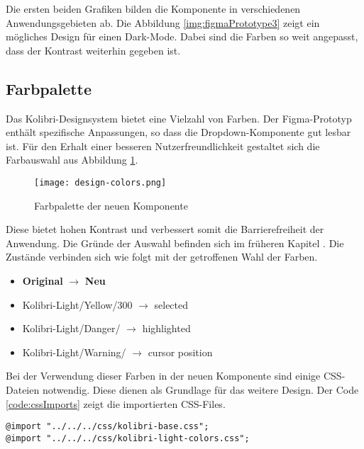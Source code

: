 Die ersten beiden Grafiken bilden die Komponente in verschiedenen Anwendungsgebieten ab. 
Die Abbildung \ref{img:figmaPrototype3} zeigt ein mögliches Design für einen Dark-Mode. 
Dabei sind die Farben so weit angepasst, dass der Kontrast weiterhin gegeben ist. 


\subsection{Farbpalette}
\label{sec:colorContrast}

Das Kolibri-Designsystem bietet eine Vielzahl von Farben. 
Der Figma-Prototyp enthält spezifische Anpassungen, so dass die Dropdown-Komponente gut lesbar ist. 
Für den Erhalt einer besseren Nutzerfreundlichkeit gestaltet sich die Farbauswahl aus Abbildung \ref{img:designColors}. 

\begin{figure}[!htb]
    \centering
    \texttt{[image: design-colors.png]}
    \caption{\centering Farbpalette der neuen Komponente}
    \label{img:designColors}
\end{figure}

Diese bietet hohen Kontrast und verbessert somit die Barrierefreiheit der Anwendung. 
Die Gründe der Auswahl befinden sich im früheren Kapitel \textbf{}. 
Die Zustände verbinden sich wie folgt mit der getroffenen Wahl der Farben. 

\begin{itemize}
    \item \textbf{Original} $\rightarrow$ \textbf{Neu}
    \item Kolibri-Light/Yellow/300 $\rightarrow$ selected
    \item Kolibri-Light/Danger/ $\rightarrow$ highlighted
    \item Kolibri-Light/Warning/ $\rightarrow$ cursor position
\end{itemize}

Bei der Verwendung dieser Farben in der neuen Komponente sind einige CSS-Dateien notwendig. 
Diese dienen als Grundlage für das weitere Design. 
Der Code \ref{code:cssImports} zeigt die importierten CSS-Files. 

\begin{lstlisting}[style = htmlcssjs, caption = Notwendige CSS-Imports, label = code:cssImports]
@import "../../../css/kolibri-base.css";
@import "../../../css/kolibri-light-colors.css";
\end{lstlisting}

